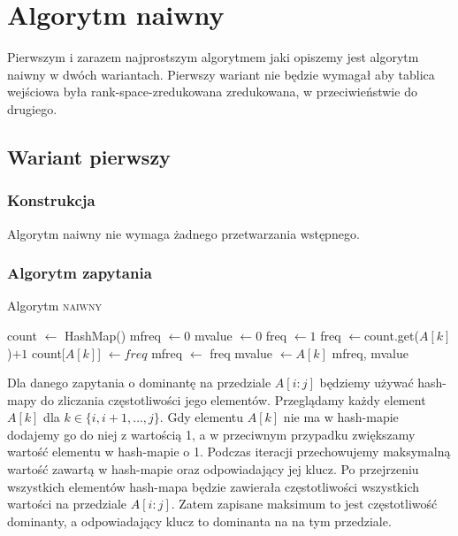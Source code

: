 \section{Algorytm naiwny}
\label{sec:naive}
Pierwszym i zarazem najprostszym algorytmem jaki opiszemy jest algorytm naiwny w dwóch wariantach. Pierwszy wariant nie będzie wymagał aby tablica wejściowa była rank-space-zredukowana zredukowana, w przeciwieństwie do drugiego.
\subsection{Wariant pierwszy}
\subsubsection{Konstrukcja}
Algorytm naiwny nie wymaga żadnego przetwarzania wstępnego.
\subsubsection{Algorytm zapytania}
\begin{algorithm}
    \caption{Algorytm \textsc{naiwny}}
    \label{alg:naive-qry}
    \begin{algorithmic}[1]
            \State count $\gets$ HashMap()
            \State mfreq $\gets 0$
            \State mvalue $\gets 0$
                \State freq $\gets 1$
                    \State freq $\gets $count.get($A[k]$)$ + 1 $
                \EndIf
                \State count[$A[k]$] $\gets freq$
                    \State mfreq $\gets$ freq
                    \State mvalue $\gets A[k]$
                \EndIf
            \EndFor
            \Return mfreq, mvalue
        \EndFunction
    \end{algorithmic}
\end{algorithm}
Dla danego zapytania o dominantę na przedziale $A[i:j]$ będziemy używać hash-mapy do zliczania częstotliwości jego elementów. Przeglądamy każdy element $A[k]$ dla $k \in \{i, i+1, \dots, j\}$. Gdy elementu $A[k]$ nie ma w hash-mapie dodajemy go do niej z wartością 1, a w przeciwnym przypadku zwiększamy wartość elementu w hash-mapie o 1.
Podczas iteracji przechowujemy maksymalną wartość zawartą w hash-mapie oraz odpowiadający jej klucz. Po przejrzeniu wszystkich elementów hash-mapa będzie zawierała częstotliwości wszystkich wartości na przedziale $A[i:j]$. Zatem zapisane maksimum to jest częstotliwość dominanty, a odpowiadający klucz to dominanta na na tym przedziale.
